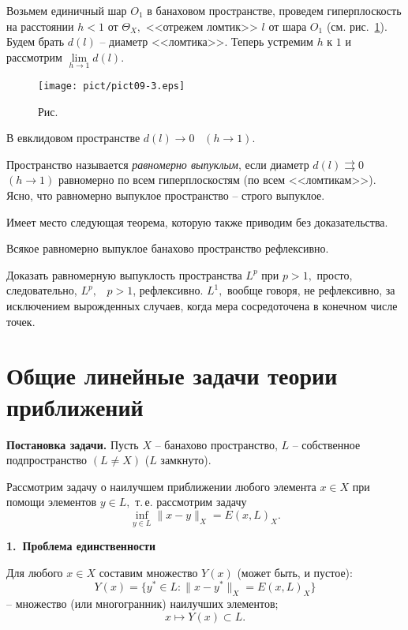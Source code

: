  Возьмем единичный шар $O_1$ в банаховом пространстве, проведем гиперплоскость
  на расстоянии $h<1$ от $\Theta_X,$ <<отрежем ломтик>> $l$ от шара $O_1$ (см. рис.~\ref{r9-3}).
   Будем брать $d(l)$
  -- диаметр <<ломтика>>. Теперь устремим $h$ к $1$ и рассмотрим
 $\lim\limits_{h\to 1} d(l).$

 \bigskip
\begin{figure}[ht]
\begin{center}
\texttt{[image: pict/pict09-3.eps]}
\end{center}
 \bigskip
 \label{r9-3}

 \centerline{Рис.~\theris}
 \bigskip
\end{figure}


\noindent В евклидовом пространстве $d(l)\to 0$~ $(h\to 1).$

 Пространство называется {\it равномерно выпуклым}, если
  диаметр $d(l) \rightrightarrows 0$~ $(h\to 1)$
  равномерно по всем гиперплоскостям {(по всем <<ломтикам>>)}.
  Ясно, что равномерно выпуклое пространство -- строго
  выпуклое.

 {Имеет место} следующая теорема, которую также приводим
 без доказательства.
 \begin{teo}[Кларксон] %
 Всякое равномерно выпуклое банахово пространство рефлексивно.
 \end{teo}

 Доказать равномерную выпуклость пространства ${L^p}$ при $p>1,$
 просто, следовательно, ${L^p},$~ $p>1$,  рефлексивно. ${L^1},$
 вообще говоря, не рефлексивно, за исключением
 вырожденных случаев, когда мера сосредоточена в
 конечном числе точек.

 \section{Общие линейные задачи теории приближений}

 {\bf Постановка задачи.} Пусть $X$ -- банахово пространство,
 $L$ -- собственное подпространство $(L\ne X)$ ($L$ замкнуто).

 Рассмотрим задачу о наилучшем приближении
 любого элемента $x\in X$ при помощи элементов $y\in L,$ т.\,е. рассмотрим
 задачу
 $$
 \inf_{y\in L} \|x-y\|_X=E(x,L)_X.
 $$

 \vspace{3mm}
 {\bf 1.~Проблема единственности}
 \vspace{3mm}

 Для любого $x\in X$ составим множество $Y(x)$
 (может быть, и пустое):
 $$
 Y(x)=\{ y^*\in L : \|x-y^*\|_X=E(x,L)_X\}
 $$
 -- множество (или многогранник) наилучших элементов;
 $$
 x\longmapsto Y(x)\subset L.
 $$

